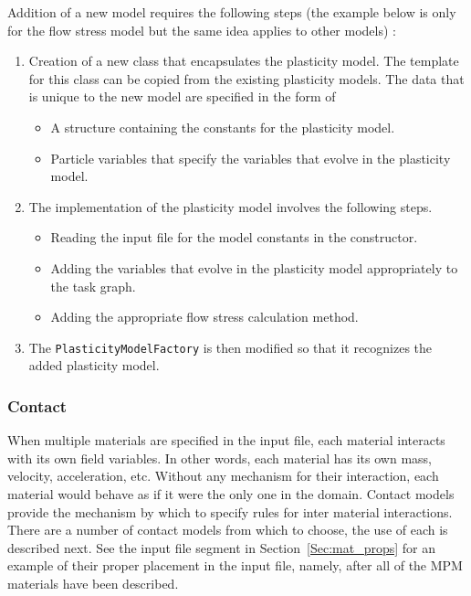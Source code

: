 Addition of a new model requires the following steps (the example below is only
for the flow stress model but the same idea applies to other models) :
\begin{enumerate}
    \item Creation of a new class that encapsulates the plasticity
    model.  The template for this class can be copied from the
    existing plasticity models.  The data that is unique to
    the new model are specified in the form of
    \begin{itemize}
      \item A structure containing the constants for the plasticity
            model.
      \item Particle variables that specify the variables that
            evolve in the plasticity model.
    \end{itemize}
    \item The implementation of the plasticity model involves the
    following steps.
    \begin{itemize}
      \item Reading the input file for the model constants in the
            constructor.
      \item Adding the variables that evolve in the plasticity model
            appropriately to the task graph.
      \item Adding the appropriate flow stress calculation method.
    \end{itemize}
    \item The \verb+PlasticityModelFactory+ is then modified so that
          it recognizes the added plasticity model.
\end{enumerate}


\subsubsection{Contact}  \label{Sec:Contact}

When multiple materials are specified in the input file, each material
interacts with its own field variables.  In other words, each material has
its own mass, velocity, acceleration, etc.  Without any mechanism for their
interaction, each material would behave as if it were the only one in the
domain.  Contact models provide the mechanism by which to specify rules
for inter material interactions.  There are a number of contact models
from which to choose, the use of each is described next.  See the input
file segment in Section~\ref{Sec:mat_props} for an example of their proper
placement in the input file, namely, after all of the MPM materials have
been described.

